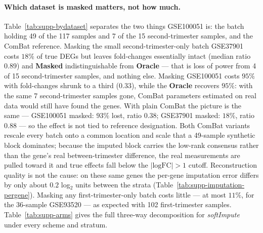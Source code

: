 \documentclass[11pt,a4paper]{article}
\begin{document}
\paragraph{Which dataset is masked matters, not how much.}
Table~\ref{tab:supp-bydataset} separates the two things
GSE100051 is: the batch holding 49 of the 117 samples and 7 of
the 15 second-trimester samples, and the ComBat reference.
Masking the small second-trimester-only batch GSE37901 costs
$18\%$ of true DEGs but leaves fold-changes essentially intact
(median ratio $0.89$) and \textbf{Masked} indistinguishable from
\textbf{Oracle} --- that is loss of power from 4 of 15
second-trimester samples, and nothing else. Masking GSE100051
costs $95\%$ with fold-changes shrunk to a third ($0.33$), while the
\textbf{Oracle} recovers $95\%$: with the same 7 second-trimester
samples gone, ComBat parameters estimated on real data would
still have found the genes. With plain ComBat the picture is the
same --- GSE100051 masked: $93\%$ lost, ratio $0.38$; GSE37901
masked: $18\%$, ratio $0.88$ --- so the effect is not tied
to reference designation. Both ComBat variants rescale every
batch onto a common location and scale that a 49-sample
synthetic block dominates; because the imputed block carries
the low-rank consensus rather than the gene's real
between-trimester difference, the real measurements are pulled
toward it and true effects fall below the $|\text{logFC}| > 1$
cutoff. Reconstruction quality is not the cause: on these same
genes the per-gene imputation error differs by only about
$0.2$ log$_2$ units between the strata
(Table~\ref{tab:supp-imputation-pergene}). Masking any
first-trimester-only batch costs little --- at most $11\%$, for
the 36-sample GSE93520 --- as expected with 102 first-trimester
samples.
Table~\ref{tab:supp-arms} gives the full three-way
decomposition for \textit{softImpute} under every scheme and
stratum.
\end{document}
